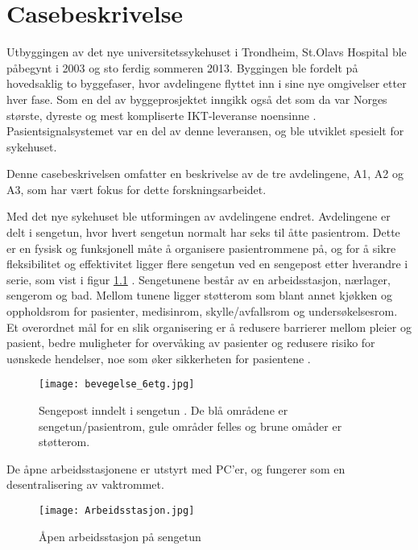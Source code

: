 \chapter{Casebeskrivelse}
\label{chp:case}
Utbyggingen av det nye universitetssykehuset i Trondheim, St.Olavs Hospital ble påbegynt i 2003 og sto ferdig sommeren 2013. Byggingen ble fordelt på hovedsaklig to byggefaser, hvor avdelingene flyttet inn i sine nye omgivelser etter hver fase. Som en del av byggeprosjektet inngikk også det som da var Norges største, dyreste og mest kompliserte IKT-leveranse noensinne \citep{TU}. Pasientsignalsystemet var en del av denne leveransen, og ble utviklet spesielt for sykehuset. 

\noindent
Denne casebeskrivelsen omfatter en beskrivelse av de tre avdelingene, A1, A2 og A3, som har vært fokus for dette forskningsarbeidet.

\noindent
Med det nye sykehuset ble utformingen av avdelingene endret. Avdelingene er delt i sengetun, hvor hvert sengetun normalt har seks til åtte pasientrom. Dette er en fysisk og funksjonell måte å organisere pasientrommene på, og for å sikre fleksibilitet og effektivitet ligger flere sengetun ved en sengepost etter hverandre i serie, som vist i figur \ref{fig:sengepost} \citep{Aslaksen, sykehuskart}. Sengetunene består av en arbeidsstasjon, nærlager, sengerom og bad. Mellom tunene ligger støtterom som blant annet kjøkken og oppholdsrom for pasienter, medisinrom, skylle/avfallsrom og undersøkelsesrom. Et overordnet mål for en slik organisering er å redusere barrierer mellom pleier og pasient, bedre muligheter for overvåking av pasienter og redusere risiko for uønskede hendelser, noe som øker sikkerheten for pasientene \citep{Sintef-sengetun}.

\begin{figure}[H]
\centering
\texttt{[image: bevegelse\_6etg.jpg]}
\caption{Sengepost inndelt i sengetun \citep{sykehuskart}. De blå områdene er sengetun/pasientrom, gule områder felles og brune omåder er støtterom.}
\label{fig:sengepost}
\end{figure}

\noindent
De åpne arbeidsstasjonene er utstyrt med PC'er, og fungerer som en desentralisering av vaktrommet. 

\begin{figure}[H]
\centering
\texttt{[image: Arbeidsstasjon.jpg]}
\caption{Åpen arbeidsstasjon på sengetun \citep{sykehuskart}}
\label{fig:arbeidsstasjon}
\end{figure}

